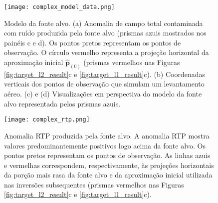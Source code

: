 \pagebreak
\begin{figure}[!htb]
	\centering
	\texttt{[image: complex\_model\_data.png]}
	\caption{Modelo da fonte alvo. (a) Anomalia de campo total contaminada com ruído produzida pela fonte alvo (prismas azuis mostrados nos painéis c e d). Os pontos pretos representam os pontos de observação. O círculo vermelho representa a projeção horizontal da aproximação inicial $\hat{\mathbf{p}}_{(0)}$ (prismas vermelhos nas Figuras
		\ref{fig:target_l2_result}c e \ref{fig:target_l1_result}c). (b) Coordenadas verticais dos pontos de observação que simulam um levantamento aéreo.
		(c) e (d) Visualizações em perspectiva do modelo da fonte alvo representada pelos prismas azuis.
	}
	\label{fig:target_model}
\end{figure}
\pagebreak

\begin{figure}[!htb]
	\centering
	\texttt{[image: complex\_rtp.png]}
	\caption{Anomalia RTP produzida pela fonte alvo. 
		A anomalia RTP mostra valores predominantemente positivos logo acima da fonte alvo. Os pontos pretos representam os pontos de observação. As linhas azuis e vermelhas correspondem, respectivamente, às projeções horizontais da porção mais rasa da fonte alvo e da aproximação inicial utilizada nas inversões subsequentes (prismas vermelhos nas Figuras \ref{fig:target_l2_result}c e 
		\ref{fig:target_l1_result}c).
	}
	\label{fig:target_model_rtp}
\end{figure}

\pagebreak

